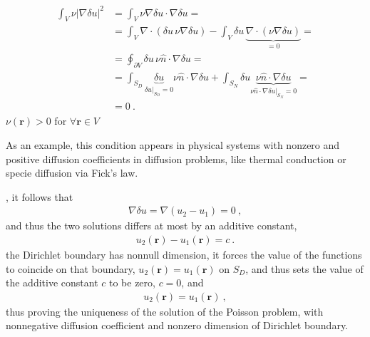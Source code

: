 \documentclass[letterpaper,10pt,english]{jupyterBook}
\begin{document}
\begin{equation*}
\begin{split}\begin{aligned}
  \int_{V} \nu |\nabla \delta u|^2
  & = \int_{V} \nu \nabla \delta u \cdot \nabla \delta u = \\
  & = \int_{V} \nabla \cdot \left( \delta u \, \nu \nabla \delta u \right) - \int_{V} \delta u \, \underbrace{\nabla \cdot ( \nu \nabla \delta u )}_{ = 0 } = \\
  & = \oint_{\partial V} \delta u \, \nu \hat{n} \cdot \nabla \delta u = \\
  & = \int_{S_D} \underbrace{ \delta u}_{ \delta u|_{S_D} = 0} \nu \hat{n} \cdot \nabla \delta u + \int_{S_N} \delta u \underbrace{\nu \hat{n} \cdot \nabla \delta u}_{\nu \hat{n} \cdot \nabla \delta u|_{S_N} = 0} = \\
  & = 0 \ .
\end{aligned}\end{split}
\end{equation*}
\sphinxAtStartPar
{} \(\nu(\mathbf{r}) > 0\) for \(\forall \mathbf{r} \in V\)%
\begin{footnote}[1]\sphinxAtStartFootnote
As an example, this condition appears in physical systems with non\sphinxhyphen{}zero and positive diffusion coefficients in diffusion problems, like thermal conduction or specie diffusion via Fick’s law.
%
\end{footnote}, it follows that
\begin{equation*}
\begin{split}\nabla \delta u = \nabla (u_2 - u_1) = 0 \ ,\end{split}
\end{equation*}
\sphinxAtStartPar
and thus the two solutions differs at most by an additive constant,
\begin{equation*}
\begin{split}u_2(\mathbf{r}) - u_1(\mathbf{r}) = c \ .\end{split}
\end{equation*}
\sphinxAtStartPar
{} the Dirichlet boundary has non\sphinxhyphen{}null dimension, it forces the value of the functions to coincide on that boundary, \(u_2(\mathbf{r}) = u_1(\mathbf{r})\) on \(S_D\), and thus sets the value  of the additive constant \(c\) to be zero, \(c = 0\), and
\begin{equation*}
\begin{split}u_2(\mathbf{r}) = u_1(\mathbf{r}) \ ,\end{split}
\end{equation*}
\sphinxAtStartPar
thus proving the uniqueness of the solution of the Poisson problem, with non\sphinxhyphen{}negative diffusion coefficient and non\sphinxhyphen{}zero dimension of Dirichlet boundary.
\end{document}
